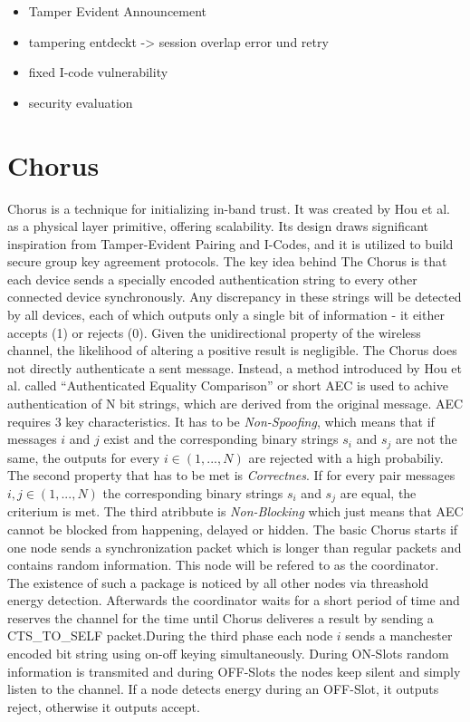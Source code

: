 \documentclass[conference]{IEEEtran}
\begin{document}
\begin{itemize}
    \item Tamper Evident Announcement
      \item tampering entdeckt -> session overlap error und retry
      \item fixed I-code vulnerability
      
    \item security evaluation 
    \end{itemize}

\section{Chorus}

Chorus is a technique for initializing in-band trust. It was created by Hou et al. as a physical layer primitive, offering scalability.
Its design draws significant inspiration from Tamper-Evident Pairing and I-Codes, and it is utilized to build secure group key agreement protocols.
The key idea behind The Chorus is that each device sends a specially encoded authentication string to every other connected device synchronously. 
Any discrepancy in these strings will be detected by all devices, each of which outputs only a single bit of information - it either accepts (1) or rejects (0).
Given the unidirectional property of the wireless channel, the likelihood of altering a positive result is negligible. The Chorus does not directly authenticate a sent message. Instead, a method introduced by Hou et al. called ``Authenticated Equality Comparison'' or short AEC is used to achive authentication of N bit strings, which are derived from the original message. 
AEC requires 3 key characteristics. It has to be \textit{Non-Spoofing}, which means that if messages $i$ and $j$ exist and the corresponding binary strings $s_i$ and $s_j$ are not the same, the outputs for every $i \in (1, . . . , N)$ are rejected with a high probabiliy. The second property that has to be met is \textit{Correctnes}. If for every pair messages $i,j \in (1, . . . , N)$ the corresponding binary strings $s_i$ and $s_j$ are equal, the criterium is met. The third atribbute is \textit{Non-Blocking} which just means that AEC cannot be blocked from happening, delayed or hidden.
The basic Chorus starts if one node sends a synchronization packet which is longer than regular packets and contains random information. This node will be refered to as the coordinator. The existence of such a package is noticed by all other nodes via threashold energy detection. Afterwards the coordinator waits for a short period of time and reserves the channel for the time until Chorus deliveres a result by sending a CTS\_TO\_SELF packet.During the third phase each node $i$ sends a manchester encoded bit string using on-off keying simultaneously. During ON-Slots random information is transmited and during OFF-Slots the nodes keep silent and simply listen to the channel. If a node detects energy during an OFF-Slot, it outputs reject, otherwise it outputs accept.
\end{document}
